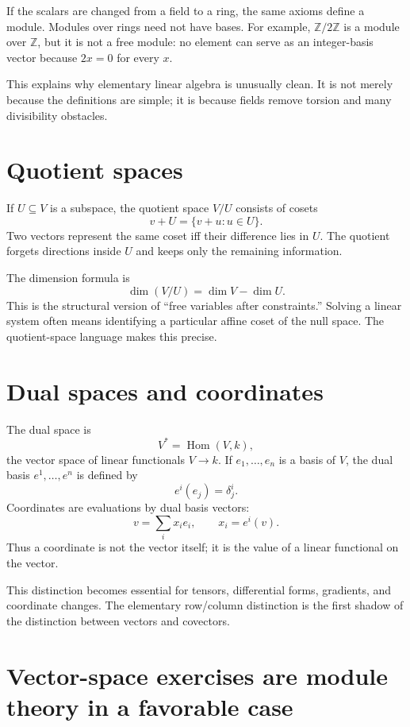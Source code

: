 If the scalars are changed from a field to a ring, the same axioms define a module.  Modules over rings need not have bases.  For example, $\mathbb Z/2\mathbb Z$ is a module over $\mathbb Z$, but it is not a free module: no element can serve as an integer-basis vector because $2x=0$ for every $x$.

This explains why elementary linear algebra is unusually clean.  It is not merely because the definitions are simple; it is because fields remove torsion and many divisibility obstacles.

\section{Quotient spaces}

If $U\subseteq V$ is a subspace, the quotient space $V/U$ consists of cosets
\[
  v+U=\{v+u:u\in U\}.
\]
Two vectors represent the same coset iff their difference lies in $U$.  The quotient forgets directions inside $U$ and keeps only the remaining information.

The dimension formula is
\[
  \dim(V/U)=\dim V-\dim U.
\]
This is the structural version of ``free variables after constraints.''  Solving a linear system often means identifying a particular affine coset of the null space.  The quotient-space language makes this precise.

\section{Dual spaces and coordinates}

The dual space is
\[
  V^*=\operatorname{Hom}(V,k),
\]
the vector space of linear functionals $V\to k$.  If $e_1,\ldots,e_n$ is a basis of $V$, the dual basis $e^1,\ldots,e^n$ is defined by
\[
  e^i(e_j)=\delta^i_j.
\]
Coordinates are evaluations by dual basis vectors:
\[
  v=\sum_i x_i e_i,\qquad x_i=e^i(v).
\]
Thus a coordinate is not the vector itself; it is the value of a linear functional on the vector.

This distinction becomes essential for tensors, differential forms, gradients, and coordinate changes.  The elementary row/column distinction is the first shadow of the distinction between vectors and covectors.

\section{Vector-space exercises are module theory in a favorable case}

